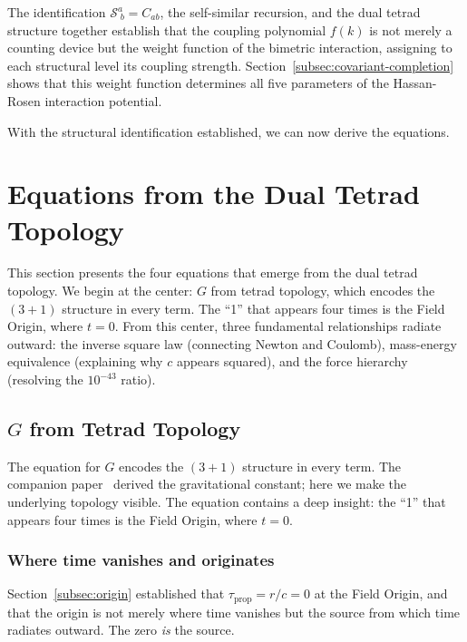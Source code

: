 \documentclass[aps,prd,preprint,superscriptaddress,showpacs,preprintnumbers,amsmath,amssymb,nofootinbib]{revtex4-2}
\begin{document}
The identification $\mathcal{S}^a_{\;b} = C_{ab}$, the self-similar recursion, and the dual tetrad structure together establish that the coupling polynomial $f(k)$ is not merely a counting device but the weight function of the bimetric interaction, assigning to each structural level its coupling strength. Section~\ref{subsec:covariant-completion} shows that this weight function determines all five parameters of the Hassan-Rosen interaction potential.

With the structural identification established, we can now derive the equations.

\section{Equations from the Dual Tetrad Topology}
\label{sec:five}

This section presents the four equations that emerge from the dual tetrad topology. We begin at the center: $G$ from tetrad topology, which encodes the $(3{+}1)$ structure in every term. The ``1'' that appears four times is the Field Origin, where $t = 0$. From this center, three fundamental relationships radiate outward: the inverse square law (connecting Newton and Coulomb), mass-energy equivalence (explaining why $c$ appears squared), and the force hierarchy (resolving the $10^{-43}$ ratio).

\subsection{$G$ from Tetrad Topology}
\label{subsec:master-eq}

The equation for $G$ encodes the $(3+1)$ structure in every term. The companion paper~\cite{paper6} derived the gravitational constant; here we make the underlying topology visible. The equation contains a deep insight: the ``1'' that appears four times is the Field Origin, where $t = 0$.

\subsubsection*{Where time vanishes and originates}

Section~\ref{subsec:origin} established that $\tau_{\text{prop}} = r/c = 0$ at the Field Origin, and that the origin is not merely where time vanishes but the source from which time radiates outward. The zero \emph{is} the source.
\end{document}
